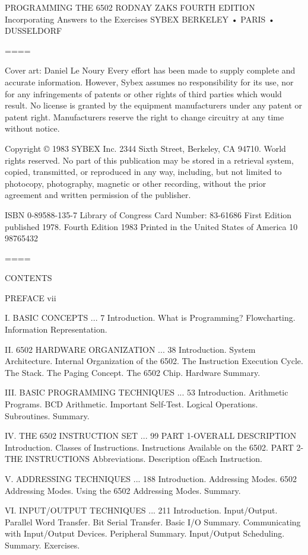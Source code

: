 \documentclass{book}
\begin{document}
PROGRAMMING
THE 6502
RODNAY ZAKS
FOURTH EDITION
Incorporating Answers to the Exercises
SYBEX
BERKELEY • PARIS • DUSSELDORF

====

Cover art: Daniel Le Noury
Every effort has been made to supply complete and accurate information. However, Sybex assumes no responsibility for its use, nor for any infringements of patents or other rights of third parties which would result. No license is granted by the equipment manufacturers under any patent or patent right. Manufacturers reserve the right to change circuitry at any time without notice.

Copyright © 1983 SYBEX Inc. 2344 Sixth Street, Berkeley, CA 94710. World rights reserved. No part of this publication may be stored in a retrieval system, copied, transmitted, or reproduced in any way, including, but not limited to photocopy, photography, magnetic or other recording, without the prior agreement and written permission of the publisher.

ISBN 0-89588-135-7
Library of Congress Card Number: 83-61686
First Edition published 1978. Fourth Edition 1983
Printed in the United States of America
10 98765432

====

CONTENTS

PREFACE vii

I. BASIC CONCEPTS ... 7
Introduction. What is Programming? Flowcharting. Information Representation.

II. 6502 HARDWARE ORGANIZATION ... 38
Introduction. System Architecture. Internal Organization of the 6502. The Instruction Execution Cycle. The Stack. The Paging Concept. The 6502 Chip. Hardware Summary.

III. BASIC PROGRAMMING TECHNIQUES ... 53
Introduction. Arithmetic Programs. BCD Arithmetic. Important Self-Test. Logical Operations. Subroutines. Summary.

IV. THE 6502 INSTRUCTION SET ... 99
PART 1-OVERALL DESCRIPTION
Introduction. Classes of Instructions. Instructions Available on the 6502.
PART 2-THE INSTRUCTIONS
Abbreviations. Description ofEach Instruction.

V. ADDRESSING TECHNIQUES ... 188
Introduction. Addressing Modes. 6502 Addressing Modes. Using the 6502 Addressing Modes. Summary.

VI. INPUT/OUTPUT TECHNIQUES ... 211
Introduction. Input/Output. Parallel Word Transfer. Bit Serial Transfer. Basic I/O Summary. Communicating with Input/Output Devices. Peripheral Summary. Input/Output Scheduling. Summary. Exercises.
\end{document}
